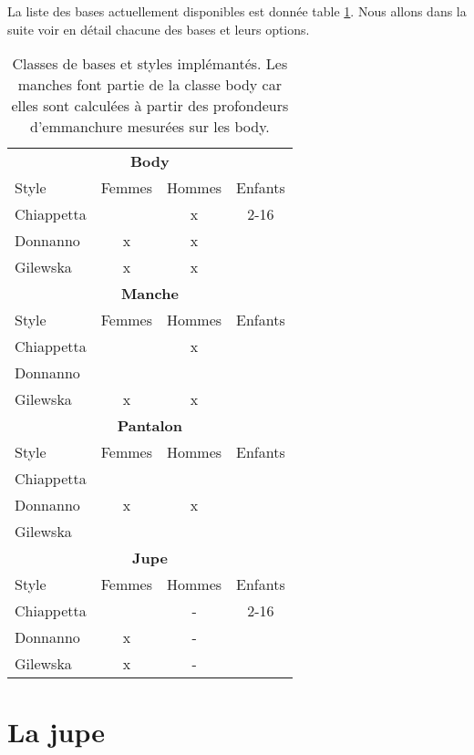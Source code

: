 \documentclass[10pt,a4paper,twoside]{report}
\begin{document}
La liste des bases actuellement disponibles est donnée table \ref{tab:basic_classes}. Nous allons dans la suite voir en détail chacune des bases et leurs options.


\begin{table}[h]
\begin{center}
\begin{tabular}{lccc} \hline
\multicolumn{4}{c}{\textbf{Body}}\\
Style & Femmes & Hommes & Enfants \\ \hline
 Chiappetta & & x & 2-16\\
 Donnanno & x & x &\\
 Gilewska & x & x &\\ \hline
 \multicolumn{4}{c}{\textbf{Manche}}\\
 Style & Femmes & Hommes & Enfants \\ \hline
  Chiappetta & & x & \\
  Donnanno &  &  &\\
  Gilewska & x & x &\\ \hline
 \multicolumn{4}{c}{\textbf{Pantalon}}\\
 Style & Femmes & Hommes & Enfants \\ \hline
 Chiappetta & & & \\
 Donnanno & x & x &\\
 Gilewska & & &\\ \hline
 \multicolumn{4}{c}{\textbf{Jupe}}\\
 Style & Femmes & Hommes & Enfants \\ \hline
 Chiappetta & & - & 2-16 \\
 Donnanno & x &-  &\\
 Gilewska & x & -&\\ \hline
\end{tabular}
\end{center}
\label{tab:basic_classes}
\caption{Classes de bases et styles implémantés. Les manches font partie de la classe body car elles sont calculées à partir des profondeurs d'emmanchure mesurées sur les body.}
\end{table}



\section{La jupe}
\end{document}
